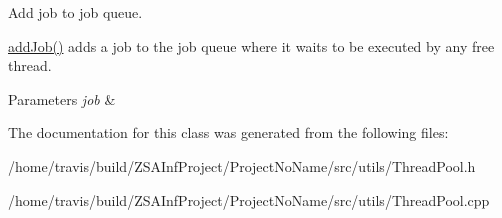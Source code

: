 Add job to job queue. 

\hyperlink{classThreadPool_a24a2e7844d83f452eac701ad8484593c}{add\-Job()} adds a job to the job queue where it waits to be executed by any free thread. 
\begin{DoxyParams}{Parameters}
{\em job} & \\
\hline
\end{DoxyParams}


The documentation for this class was generated from the following files\-:\begin{DoxyCompactItemize}
\item 
/home/travis/build/\-Z\-S\-A\-Inf\-Project/\-Project\-No\-Name/src/utils/Thread\-Pool.\-h\item 
/home/travis/build/\-Z\-S\-A\-Inf\-Project/\-Project\-No\-Name/src/utils/Thread\-Pool.\-cpp\end{DoxyCompactItemize}
